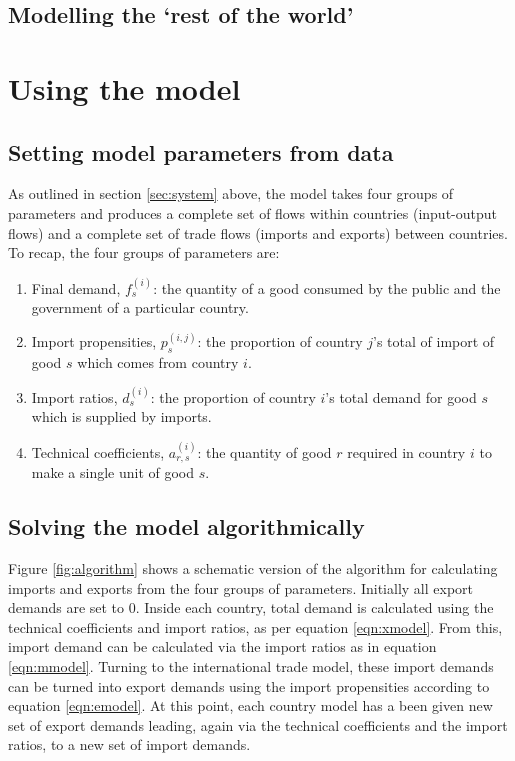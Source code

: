 \documentclass[a4paper]{article}
\begin{document}
\subsection{Modelling the `rest of the world'}\label{sec:RoW}

\section{Using the model}\label{sec:algorithm}

\subsection{Setting model parameters from data}
As outlined in section \ref{sec:system} above, the model takes four groups of parameters and produces a complete set of flows within countries (input-output flows) and a complete set of trade flows (imports and exports) between countries.
To recap, the four groups of parameters are:
\begin{enumerate}
\item Final demand, $f_s^{(i)}$: the quantity of a good consumed by the public and the government of a particular country.
\item Import propensities, $p_s^{(i,j)}$: the proportion of country $j$'s total of import of good $s$ which comes from country $i$.
\item Import ratios, $d_s^{(i)}$: the proportion of country $i$'s total demand for good $s$ which is supplied by imports.
\item Technical coefficients, $a_{r,s}^{(i)}$: the quantity of good $r$ required in country $i$ to make a single unit of good $s$.
\end{enumerate}

\subsection{Solving the model algorithmically}\label{sec:algorithm_subsec}

Figure \ref{fig:algorithm} shows a schematic version of the algorithm for calculating imports and exports from the four groups of parameters.
Initially all export demands are set to 0.
Inside each country, total demand is calculated using the technical coefficients and import ratios, as per equation \eqref{eqn:xmodel}.
From this, import demand can be calculated via the import ratios as in equation \eqref{eqn:mmodel}.
Turning to the international trade model, these import demands can be turned into export demands using the import propensities according to equation \eqref{eqn:emodel}.
At this point, each country model has a been given new set of export demands leading, again via the technical coefficients and the import ratios, to a new set of import demands.
\end{document}
